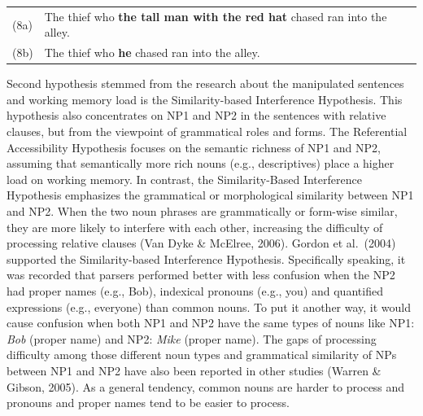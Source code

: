 \documentclass[
]{article}
\begin{document}
\vspace{1em}

\setlength{\parindent}{0pt}
\noindent
\begin{tabular}[t]{@{}p{0.05\linewidth} p{0.95\linewidth}@{}}
(8a) & The thief who \textbf{the tall man with the red hat} chased ran into the alley. \\
(8b) & The thief who \textbf{he} chased ran into the alley. \\
\end{tabular}

\vspace{1em}

\setlength{\parindent}{1.27cm}

Second hypothesis stemmed from the research about the manipulated
sentences and working memory load is the Similarity-based Interference
Hypothesis. This hypothesis also concentrates on NP1 and NP2 in the
sentences with relative clauses, but from the viewpoint of grammatical
roles and forms. The Referential Accessibility Hypothesis focuses on the
semantic richness of NP1 and NP2, assuming that semantically more rich
nouns (e.g., descriptives) place a higher load on working memory. In
contrast, the Similarity-Based Interference Hypothesis emphasizes the
grammatical or morphological similarity between NP1 and NP2. When the
two noun phrases are grammatically or form-wise similar, they are more
likely to interfere with each other, increasing the difficulty of
processing relative clauses (Van Dyke \& McElree, 2006). Gordon et
al.~(2004) supported the Similarity-based Interference Hypothesis.
Specifically speaking, it was recorded that parsers performed better
with less confusion when the NP2 had proper names (e.g., Bob), indexical
pronouns (e.g., you) and quantified expressions (e.g., everyone) than
common nouns. To put it another way, it would cause confusion when both
NP1 and NP2 have the same types of nouns like NP1: \emph{Bob} (proper
name) and NP2: \emph{Mike} (proper name). The gaps of processing
difficulty among those different noun types and grammatical similarity
of NPs between NP1 and NP2 have also been reported in other studies
(Warren \& Gibson, 2005). As a general tendency, common nouns are harder
to process and pronouns and proper names tend to be easier to process.
\end{document}
